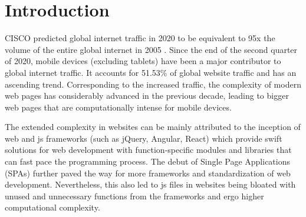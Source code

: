 \section{Introduction}




CISCO predicted global internet traffic in 2020 to be equivalent to 95x the volume of the entire global internet in 2005 \cite{ciscoforecast}. Since the end of the second quarter of 2020, mobile devices (excluding tablets) have been a major contributor to global internet traffic. It accounts for 51.53\% of global website traffic and has an ascending trend. Corresponding to the increased traffic, the complexity of modern web pages has considerably advanced in the previous decade, leading to bigger web pages that are computationally intense for mobile devices. 

The extended complexity in websites can be mainly attributed to the inception of web and \acrfull{js} frameworks (such as jQuery, Angular, React) \cite{persson2020javascript} which provide swift solutions for web development with function-specific modules and libraries that can fast pace the programming process. The debut of Single Page Applications (SPAs) further paved the way for more frameworks and standardization of web development. Nevertheless, this also led to \acrshort{js} files in websites being bloated with unused and unnecessary functions from the frameworks and ergo higher computational complexity.

